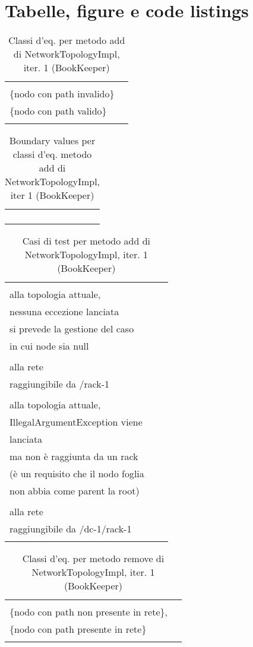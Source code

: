 \documentclass[10pt, a4paper]{article}
\newcommand{\Intmaketable}[4]{
	\begin{longtable}{#3}
	#4
	\caption{#2}
	\label{#1}
	\end{longtable}
}
\newcommand{\Intceqtable}[3]{
	\Intmaketable{#1}{#2}{|l|l|}{
	\hline
	\thead{Parametro formale} & \thead{Classi d'equivalenza} \\
	\hline
	\hline
	#3
	\hline}
}
\newcommand{\Intbvtable}[3]{
	\Intmaketable{#1}{#2}{|l|l|l|}{
	\hline
	\thead{Parametro formale} & \thead{Classe d'equivalenza} & \thead{Boundary value}\\
	\hline
	\hline
	#3
	\hline}
}
\newcommand{\Inttestctable}[3]{
	\Intmaketable{#1}{#2}{|l|l|l|}{
	\hline
	\thead{Input} & \thead{Esito atteso} & \thead{Motivazione}\\
	\hline
	\hline
	#3
	\hline}
}
\newcommand{\Intceqcaption}[4]{Classi d'eq. per metodo #1 di #2, iter. #3 (#4)}
\newcommand{\Intbvcaption}[4]{Boundary values per classi d'eq. metodo #1 di #2, iter #3 (#4)}
\newcommand{\Inttestccaption}[4]{Casi di test per metodo #1 di #2, iter. #3 (#4)}
\newcommand{\gettablelabel}[5]{table:#1:#2:#3:iter#4:proj#5}
\newcommand{\ceqtable}[5]{
	\Intceqtable{\gettablelabel{ceq}{#1}{#2}{#3}{#4}}
		{\Intceqcaption{#1}{#2}{#3}{#4}}
		{#5}
}
\newcommand{\bvtable}[5]{
	\Intbvtable{\gettablelabel{bv}{#1}{#2}{#3}{#4}}
		{\Intbvcaption{#1}{#2}{#3}{#4}}
		{#5}
}
\newcommand{\testctable}[5]{
	\Inttestctable{\gettablelabel{testc}{#1}{#2}{#3}{#4}}
		{\Inttestccaption{#1}{#2}{#3}{#4}}
		{#5}
}
\newcommand{\tcell}{\makecell[tl]}
\newcommand{\newtrow}{\\ \hline}
\def\bookkeeper{BookKeeper}
\newcommand{\ceq}[1]{\{#1\}}
\begin{document}
	\newpage
	\section{Tabelle, figure e code listings}
	
	
	\ceqtable{add}{NetworkTopologyImpl}{1}{\bookkeeper}{
			\tcell{node} & \tcell{\ceq{null} \\ \ceq{nodo con path invalido} \\ \ceq{nodo con path valido} }
		\newtrow
	}
	
	\bvtable{add}{NetworkTopologyImpl}{1}{\bookkeeper}{
			\tcell{node} & \tcell{\ceq{null}} & \tcell{null}
		\newtrow
			\tcell{node} & \tcell{\ceq{nodo con path invalido}} & \tcell{Node("/bookie-1")}
		\newtrow
			\tcell{node} & \tcell{\ceq{nodo con path valido}} & \tcell{Node("/rack-1/bookie-1")}
		\newtrow
	}
	
	\testctable{add}{NetworkTopologyImpl}{1}{\bookkeeper}{
			\tcell{null} & \tcell{Nessuna variazione rispetto\\ alla topologia attuale,\\ nessuna 
			eccezione lanciata} & \tcell{Specifica della documentazione:\\ si prevede la gestione del 
			caso\\ in cui node sia null}
		\newtrow
			\tcell{buildNode("/rack-1","bookie-1")} & \tcell{Aggiunta con successo del nodo\\ alla rete} 
			& \tcell{Il nodo è una foglia (un server bk)\\ raggiungibile da /rack-1}
		\newtrow
			\tcell{buildNode("/","bookie-2")} & \tcell{Nessuna variazione rispetto \\ alla topologia 
			attuale, \\IllegalArgumentException viene\\ lanciata} & 
			\tcell{Il nodo è una foglia (un server bk)\\ ma non è raggiunta da un rack \\
			(è un requisito che il nodo foglia\\ non abbia come parent la root) }
		\newtrow
			\tcell{buildNode("/dc-1/rack-1", "bookie-3")} & \tcell{Aggiunta con successo del nodo\\ alla 
			rete} & \tcell{Il nodo è una foglia (un server bk)\\ raggiungibile da /dc-1/rack-1}
		\newtrow
	}
	
	\ceqtable{remove}{NetworkTopologyImpl}{1}{\bookkeeper}{
			\tcell{node} & \tcell{\ceq{null}, \\ \ceq{nodo con path non presente in rete},\\ \ceq{nodo 
			con path presente in rete}}
		\newtrow
	}
	
\end{document}
